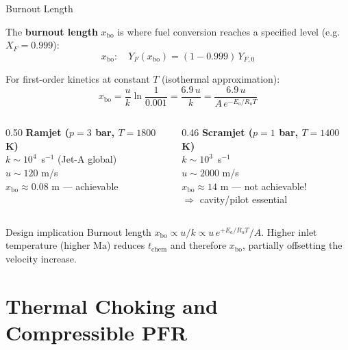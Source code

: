 \documentclass[12pt,aspectratio=169]{beamer}
\newcommand{\tchem}{t_{\text{chem}}}
\newcommand{\Ma}{\mathrm{Ma}}
\begin{document}
\begin{frame}{Burnout Length}

  The \textbf{burnout length} $x_{\text{bo}}$ is where fuel conversion
  reaches a specified level (e.g.\ $X_F = 0.999$):
  \[
    x_{\text{bo}} : \quad Y_F(x_{\text{bo}}) = (1 - 0.999)\,Y_{F,0}
  \]

  For first-order kinetics at constant $T$ (isothermal approximation):
  \[
    x_{\text{bo}} = \frac{u}{k}\ln\frac{1}{0.001}
    = \frac{6.9\,u}{k}
    = \frac{6.9\,u}{A\,e^{-E_a/R_u T}}
  \]

  \begin{columns}[t]
    \begin{column}{0.50\textwidth}
      \textbf{Ramjet ($p=3$ bar, $T=1800$ K)}\\
      $k \sim 10^4$~s$^{-1}$ (Jet-A global)\\
      $u \sim 120$ m/s\\
      $x_{\text{bo}} \approx 0.08$ m --- achievable
    \end{column}
    \begin{column}{0.46\textwidth}
      \textbf{Scramjet ($p=1$ bar, $T=1400$ K)}\\
      $k \sim 10^3$~s$^{-1}$\\
      $u \sim 2000$ m/s\\
      $x_{\text{bo}} \approx 14$ m --- \alert{not achievable!}\\
      $\Rightarrow$ cavity/pilot essential
    \end{column}
  \end{columns}

  \begin{exampleblock}{Design implication}
    Burnout length $x_{\text{bo}} \propto u/k \propto u\,e^{+E_a/R_u T}/A$.
    Higher inlet temperature (higher $\Ma$) reduces $\tchem$ and
    therefore $x_{\text{bo}}$, partially offsetting the velocity increase.
  \end{exampleblock}
\end{frame}

\section{Thermal Choking and Compressible PFR}
\end{document}
